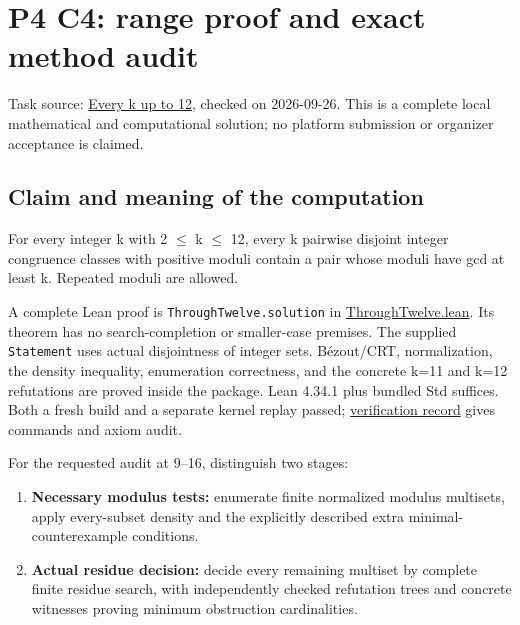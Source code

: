 \documentclass[11pt,a4paper]{article}
\providecommand{\tightlist}{\setlength{\itemsep}{0pt}\setlength{\parskip}{0pt}}
\begin{document}
\section{P4 C4: range proof and exact method audit}\label{p4-c4-range-proof-and-exact-method-audit}

Task source: \href{https://hackathon.bainsa.ai/p/p4/c4}{Every k up to 12}, checked on 2026-09-26. This is a complete local mathematical and computational solution; no platform submission or organizer acceptance is claimed.

\subsection{Claim and meaning of the computation}\label{claim-and-meaning-of-the-computation}

For every integer k with 2 \ensuremath{\leq} k \ensuremath{\leq} 12, every k pairwise disjoint integer congruence classes with positive moduli contain a pair whose moduli have gcd at least k. Repeated moduli are allowed.

A complete Lean proof is \texttt{ThroughTwelve.solution} in \href{https://github.com/mpelteshki/climbing-to-the-frontier/blob/212bba53b1818c08c40b8c4b48f636651eaf6410/cagent/p4/lean/ProofPursuit/P4/ThroughTwelve.lean}{ThroughTwelve.lean}. Its theorem has no search-completion or smaller-case premises. The supplied \texttt{Statement} uses actual disjointness of integer sets. B\'{e}zout/CRT, normalization, the density inequality, enumeration correctness, and the concrete k=11 and k=12 refutations are proved inside the package. Lean 4.34.1 plus bundled Std suffices. Both a fresh build and a separate kernel replay passed; \href{https://github.com/mpelteshki/climbing-to-the-frontier/blob/212bba53b1818c08c40b8c4b48f636651eaf6410/cagent/p4/verification.md}{verification record} gives commands and axiom audit.

For the requested audit at 9--16, distinguish two stages:

\begin{enumerate}
\def\labelenumi{\arabic{enumi}.}
\tightlist
\item
  \textbf{Necessary modulus tests:} enumerate finite normalized modulus multisets, apply every-subset density and the explicitly described extra minimal-counterexample conditions.
\item
  \textbf{Actual residue decision:} decide every remaining multiset by complete finite residue search, with independently checked refutation trees and concrete witnesses proving minimum obstruction cardinalities.
\end{enumerate}
\end{document}
